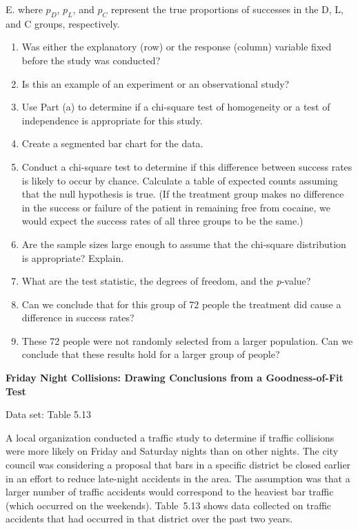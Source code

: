 \documentclass[
]{report}
\newcounter{excount}
\renewcommand{\theexcount}{E\arabic{excount}}
\begin{document}
\begin{list}{\theexcount.}{ \setlength{\itemsep}{0.5em}}
  where $p_D$, $p_L$, and $p_C$ represent the true proportions of successes in the D, L, and C groups,
respectively.
  \begin{enumerate}
    \item Was either the explanatory (row) or the response (column) variable fixed before the study was conducted?
    \item Is this an example of an experiment or an observational study?
    \item Use Part (a) to determine if a chi-square test of homogeneity or a test of independence is appropriate for this study.
    \item Create a segmented bar chart for the data.
    \item Conduct a chi-square test to determine if this difference between success rates is likely to occur by chance. Calculate a table of expected counts assuming that the null hypothesis is true. (If the
treatment group makes no difference in the success or failure of the patient in remaining free
from cocaine, we would expect the success rates of all three groups to be the same.)
    \item Are the sample sizes large enough to assume that the chi-square distribution is appropriate? Explain.
    \item What are the test statistic, the degrees of freedom, and the \textit{p}-value?
    \item Can we conclude that for this group of 72 people the treatment did cause a difference in success rates?
    \item These 72 people were not randomly selected from a larger population. Can we conclude that these results hold for a larger group of people?
  \end{enumerate}

  \item \textbf{Friday Night Collisions: Drawing Conclusions from a Goodness-of-Fit Test}    

  Data set: Table 5.13    
  
  A local organization conducted a traffic study to determine if traffic collisions were more likely on Friday and Saturday nights than on other nights. The city council was considering a proposal that bars in a specific district be closed earlier in an effort to reduce late-night accidents in the area. The assumption was that a larger number of traffic accidents would correspond to the heaviest bar traffic (which occurred on the weekends). Table 5.13 shows data collected on traffic accidents that had occurred in that district over the past two years.  
  

\end{list}
\end{document}
